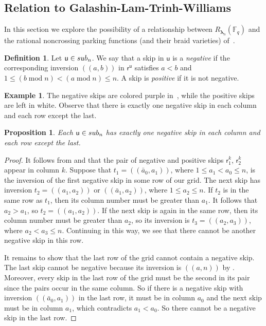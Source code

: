 \documentclass[a4paper,10pt,leqno]{amsart}
\newcommand{\darkred}{\color{darkred}}
\numberwithin{equation}{section}
\newtheorem{proposition}[theorem]{Proposition}
\theoremstyle{definition}
\newtheorem{definition}[theorem]{Definition}
\newtheorem{example}[theorem]{Example}
\theoremstyle{remark}
\renewcommand{\u}{\mathsf{u}}
\renewcommand{\S}{\textsc{sub}}
\newcommand{\FF}{\mathbb{F}}
\renewcommand{\mod}{\;\mathrm{mod}\;}
\newcommand{\rr}{\mathsf{r}}
\newcommand{\rru}{\rr^\u}
\newcommand{\rrs}{\rr^k_1}
\newcommand{\rrf}{\rr^k_2}
\newcommand{\blambda}{\bm{\lambda}}
\newcommand{\defn}[1]{\emph{\darkred #1}}
\begin{document}
\subsection{Relation to Galashin-Lam-Trinh-Williams}

In this section we explore the possibility of a relationship between $R_{\blambda_n}(\FF_q)$ and the rational noncrossing parking functions (and their braid varieties) of~\cite[Section 8.5]{galashin2022rational}.

\begin{definition}
  Let $\u \in \S_n$.  We say that a skip in $\u$ is a \defn{negative} if the corresponding inversion $(\!(a,b)\!)$ in $\rru$ satisfies $a < b$ and $1 \leq (b \mod n) < (a \mod n) \leq n$.  A skip is \defn{positive} if it is not negative.
\end{definition}

\begin{example}
The negative skips are colored purple in~, while the positive skips are left in white.  Observe that there is exactly one negative skip in each column and each row except the last.
\end{example}

\begin{proposition}
\label{prop:negatives}
  Each $\u \in \S_n$ has exactly one negative skip in each column and each row except the last.%
\end{proposition}
\begin{proof}
  It follows from  and  that the pair of negative and positive skips $\rrs$, $\rrf$ appear in column $k$.
  Suppose that $t_1= (\!(\bar{a}_0,a_1)\!)$, where $1 \leq a_1 < a_0 \leq n$, is the inversion of the first negative skip in some row of our grid. The next skip has inversion $t_2 = (\!(a_1,a_2)\!)$ or $(\!(\bar{a}_1,a_2)\!)$, where $1 \leq a_2 \leq n$. If $t_2$ is in the same row as $t_1$, then its column number must be greater than $a_1$. It follows that $a_2 > a_1$, so $t_2 = (\!(a_1,a_2)\!)$. If the next skip is again in the same row, then its column number must be greater than $a_2$, so its inversion is $t_3 = (\!(a_2,a_3)\!)$, where $a_2 < a_3 \leq n$. Continuing in this way, we see that there cannot be another negative skip in this row.
  
  It remains to show that the last row of the grid cannot contain a negative skip. The last skip cannot be negative because its inversion is $(\!(a,n )\!)$ by . Moreover, every skip in the last row of the grid must be the second in its pair since the pairs occur in the same column. So if there is a negative skip with inversion $(\!(\bar{a}_0, a_1)\!)$ in the last row, it must be in column $a_0$ and the next skip must be in column $a_1$, which contradicts $a_1 < a_0$. So there cannot be a negative skip in the last row.
\end{proof}
\end{document}

